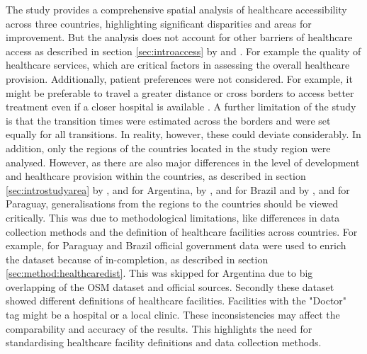 \documentclass[11pt, a4paper]{report}
\begin{document}
%
The study provides a comprehensive spatial analysis of healthcare accessibility across three countries, highlighting significant disparities and areas for improvement. But the analysis does not account for other barriers of healthcare access as described in section \ref{sec:introaccess} by \cite{wang_assessing_2005} and \cite{carrillo_defining_2011}. For example the quality of healthcare services, which are critical factors in assessing the overall healthcare provision. Additionally, patient preferences were not considered. For example, it might be preferable to travel a greater distance or cross borders to access better treatment even if a closer hospital is available .
A further limitation of the study is that the transition times were estimated across the borders and were set equally for all transitions. In reality, however, these could deviate considerably. 
In addition, only the regions of the countries located in the study region were analysed. However, as there are also major differences in the level of development and healthcare provision within the countries, as described in section \ref{sec:introstudyarea} by \cite{gilardino_access_2016}, \cite{palacios_need_2020} and \cite{vacarezza_exploring_2023} for Argentina, by \cite{palmeira_analysis_2022}, \cite{santos_health_2022} and \cite{silva_emergency_2021} for Brazil and by \cite{amnesty_international_usa_paraguay_2024}, \cite{capurro_socioeconomic_2022} and \cite{world_health_organization_access_2024} for Paraguay, generalisations from the regions to the countries should be viewed critically. This was due to methodological limitations, like differences in data collection methods and the definition of healthcare facilities across countries. For example, for Paraguay and Brazil official government data were used to enrich the dataset because of in-completion, as described in section \ref{sec:method:healthcaredist}. This was skipped for Argentina due to big overlapping of the OSM dataset and official sources. Secondly these dataset showed different definitions of healthcare facilities. Facilities with the "Doctor" tag might be a hospital or a local clinic. These inconsistencies may affect the comparability and accuracy of the results. This highlights the need for standardising healthcare facility definitions and data collection methods.
 \\
%
\end{document}
